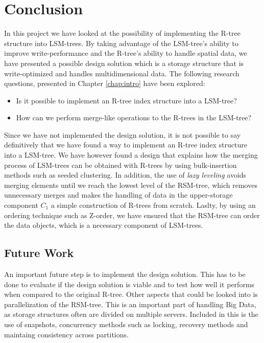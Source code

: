 \chapter{Conclusion}
In this project we have looked at the possibility of implementing the R-tree structure into LSM-trees. By taking advantage of the LSM-tree's ability to improve write-performance and the R-tree's ability to handle spatial data, we have presented a possible design solution which is a storage structure that is write-optimized and handles multidimensional data. The following research questions, presented in Chapter \ref{chap:intro} have been explored: 

\begin{itemize}
    \item Is it possible to implement an R-tree index structure into a LSM-tree?
    \item How can we perform merge-like operations to the R-trees in the LSM-tree?
\end{itemize}

\noindent
Since we have not implemented the design solution, it is not possible to say definitively that we have found a way to implement an R-tree index structure into a LSM-tree. We have however found a design that explains how the merging process of LSM-trees can be obtained with R-trees by using bulk-insertion methods such as seeded clustering. In addition, the use of \emph{lazy leveling} avoids merging elements until we reach the lowest level of the RSM-tree, which removes unnecessary merges and makes the handling of data in the upper-storage component $C_1$ a simple construction of R-trees from scratch. Laslty, by using an ordering technique such as Z-order, we have ensured that the RSM-tree can order the data objects, which is a necessary component of LSM-trees.  


\section{Future Work}
An important future step is to implement the design solution. This has to be done to evaluate if the design solution is viable and to test how well it performs when compared to the original R-tree. Other aspects that could be looked into is parallelization of the RSM-tree. This is an important part of handling Big Data, as storage structures often are divided on multiple servers. Included in this is the use of snapshots, concurrency methods such as locking, recovery methods and maintaing consistency across partitions. 

